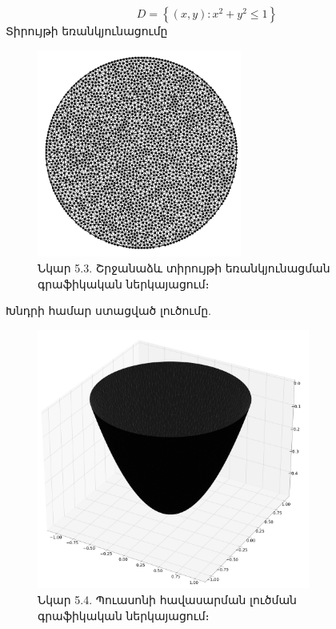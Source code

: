 \documentclass[fleqn, bachelor,subf,12pt,notitlepage]{article}
\begin{document}
$$ D = \left\{\left(x,y\right): x^{2}+y^{2} \leq 1\right\}$$
Տիրույթի եռանկյունացումը
\begin{figure}[H]
\centering
\includegraphics[width=0.6\textwidth]{images/circle_mesh}
\captionsetup{labelformat=empty}
\caption{Նկար 5.3. Շրջանաձև տիրույթի եռանկյունացման գրաֆիկական ներկայացում։}
\end{figure}
Խնդրի համար ստացված լուծումը.
\begin{figure}[H]
\centering
\includegraphics[width=0.8\textwidth]{images/poisson_equation_on_unit_circle_solution}
\captionsetup{labelformat=empty}
\caption{Նկար 5.4. Պուասոնի հավասարման լուծման գրաֆիկական ներկայացում։}
\end{figure}
\newpage
\end{document}
